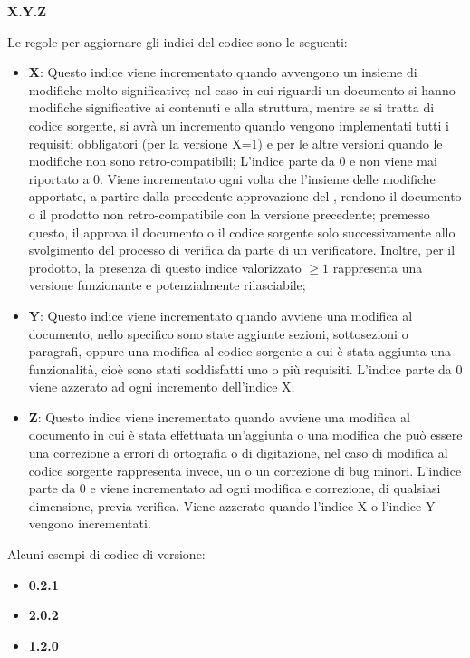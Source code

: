 \begin{center}
	\textbf{X.Y.Z}
\end{center}
Le regole per aggiornare gli indici del codice sono le seguenti:
\begin{itemize}
	\item \textbf{X}: Questo indice viene incrementato quando avvengono un insieme di modifiche molto significative; nel caso in cui riguardi un documento si hanno modifiche significative ai contenuti e alla struttura, mentre se si tratta di codice sorgente, si avrà un incremento quando vengono implementati tutti i requisiti obbligatori (per la versione X=1) e per le altre versioni quando le modifiche non sono retro-compatibili;
	L'indice parte da 0 e non viene mai riportato a 0. Viene incrementato ogni volta che l'insieme delle modifiche apportate, a partire dalla precedente approvazione del \Responsabile{}, rendono il documento o il prodotto non retro-compatibile con la versione precedente; premesso questo, il \Responsabile{} approva il documento o il codice sorgente solo successivamente allo svolgimento del processo di verifica da parte di un verificatore. Inoltre, per il prodotto, la presenza di questo indice valorizzato $\geq 1$ rappresenta una versione funzionante e potenzialmente rilasciabile; 
	\item \textbf{Y}: Questo indice viene incrementato quando avviene una modifica al documento, nello specifico sono state aggiunte sezioni, sottosezioni o paragrafi, oppure una modifica al codice sorgente a cui è stata aggiunta una funzionalità, cioè sono stati soddisfatti uno o più requisiti.
	L'indice parte da 0 viene azzerato ad ogni incremento dell'indice X;
	\item \textbf{Z}: Questo indice viene incrementato quando avviene una modifica al documento in cui è stata effettuata un'aggiunta o una modifica che può essere una correzione a errori di ortografia o di digitazione, nel caso di modifica al codice sorgente rappresenta invece, un  o un correzione di bug minori.
	L'indice parte da 0 e viene incrementato ad ogni modifica e correzione, di qualsiasi dimensione, previa verifica.
	Viene azzerato quando l'indice X o l'indice Y vengono incrementati.
\end{itemize}
Alcuni esempi di codice di versione:
\begin{itemize}
	\item \textbf{0.2.1}
	\item \textbf{2.0.2}
	\item \textbf{1.2.0}
\end{itemize}
